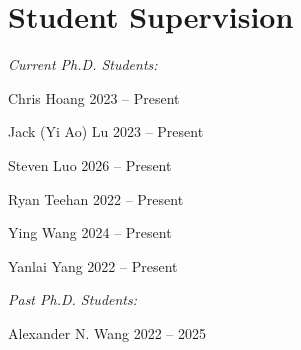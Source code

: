 \if{}
\section{\sc Student Supervision}

\textit{Current Ph.D. Students:}
\begin{list2}
\item Chris Hoang \hfill 2023 -- Present
\item Jack (Yi Ao) Lu \hfill 2023 -- Present
\item Steven Luo \hfill 2026 -- Present
\item Ryan Teehan \hfill 2022 -- Present
\item Ying Wang \hfill 2024 -- Present
\item Yanlai Yang \hfill 2022 -- Present
\end{list2}

\textit{Past Ph.D. Students:}
\begin{list2}
\item Alexander N. Wang \hfill 2022 -- 2025
\end{list2}




